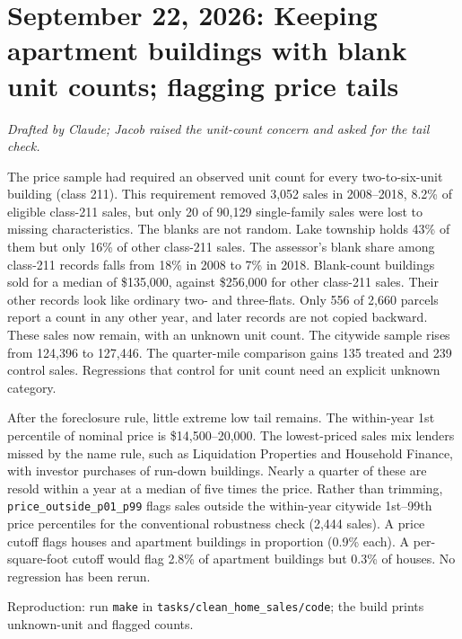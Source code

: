 \section*{September 22, 2026: Keeping apartment buildings with blank unit counts; flagging price tails}
\textit{Drafted by Claude; Jacob raised the unit-count concern and asked for the tail check.}

The price sample had required an observed unit count for every two-to-six-unit
building (class 211). This requirement removed 3,052 sales in 2008--2018,
8.2\% of eligible class-211 sales, but only 20 of 90,129 single-family sales
were lost to missing characteristics. The blanks are not random. Lake township
holds 43\% of them but only 16\% of other class-211 sales. The assessor's blank
share among class-211 records falls from 18\% in 2008 to 7\% in 2018. Blank-count
buildings sold for a median of \$135,000, against \$256,000 for other
class-211 sales. Their other records look like ordinary two- and three-flats.
Only 556 of 2,660 parcels report a count in any other year, and later records
are not copied backward. These sales now remain, with an unknown unit count.
The citywide sample rises from 124,396 to 127,446. The quarter-mile comparison
gains 135 treated and 239 control sales. Regressions that control for unit
count need an explicit unknown category.

After the foreclosure rule, little extreme low tail remains. The within-year 1st
percentile of nominal price is \$14,500--20,000. The lowest-priced sales mix
lenders missed by the name rule, such as Liquidation Properties and Household
Finance, with investor purchases of run-down buildings. Nearly a quarter of
these are resold within a year at a median of five times the price. Rather
than trimming, \texttt{price\_outside\_p01\_p99} flags sales outside the
within-year citywide 1st--99th price percentiles for the conventional
robustness check (2,444 sales). A price cutoff flags houses and apartment
buildings in proportion (0.9\% each). A per-square-foot cutoff would flag
2.8\% of apartment buildings but 0.3\% of houses. No regression has been rerun.

\small
Reproduction: run \texttt{make} in \texttt{tasks/clean\_home\_sales/code}; the
build prints unknown-unit and flagged counts.
\normalsize
